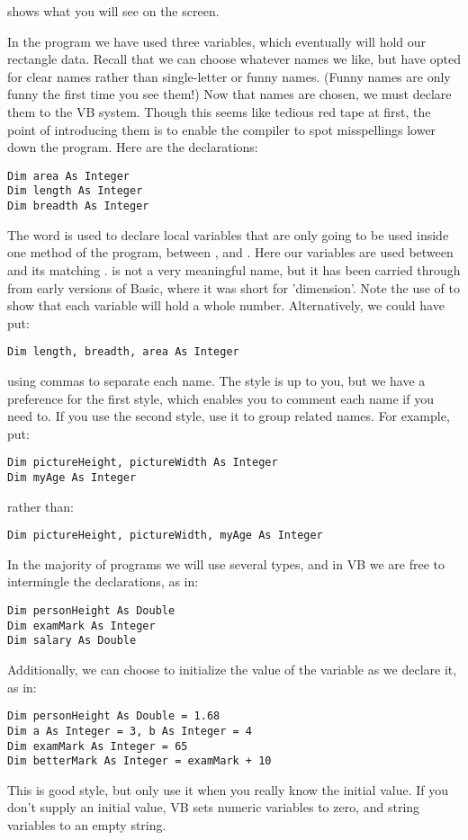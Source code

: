 		 shows what you will see on the screen.

		In the program we have used three  variables, which eventually will hold our rectangle data. Recall that we can choose whatever names we like, but have opted for clear names rather than single-letter or funny names. (Funny names are only funny the first time you see them!)
		Now that names are chosen, we must declare them to the VB system. Though this seems like tedious red tape at first, the point of introducing them is to enable the compiler to spot misspellings lower down the program. Here are the declarations:
		\begin{lstlisting}
Dim area As Integer
Dim length As Integer
Dim breadth As Integer
		\end{lstlisting}
		The word  is used to declare local variables that are only going to be used inside one method of the program, between , and . Here our variables are used between  and its matching .  is not a very meaningful name, but it has been carried through from early versions of Basic, where it was short for 'dimension'.
Note the use of  to show that each variable will hold a whole number. Alternatively, we could have put:
		\begin{lstlisting}
Dim length, breadth, area As Integer
		\end{lstlisting}
		using commas to separate each name. The style is up to you, but we have a preference for the first style, which enables you to comment each name if you need to. If you use the second style, use it to group related names. For example, put:
		\begin{lstlisting}
Dim pictureHeight, pictureWidth As Integer
Dim myAge As Integer
		\end{lstlisting}
		rather than:
		\begin{lstlisting}
Dim pictureHeight, pictureWidth, myAge As Integer
		\end{lstlisting}
		In the majority of programs we will use several types, and in VB we are free to intermingle the declarations, as in:
		\begin{lstlisting}
Dim personHeight As Double
Dim examMark As Integer
Dim salary As Double
		\end{lstlisting}
Additionally, we can choose to initialize the value of the variable as we declare it, as in:
		\begin{lstlisting}
Dim personHeight As Double = 1.68
Dim a As Integer = 3, b As Integer = 4
Dim examMark As Integer = 65
Dim betterMark As Integer = examMark + 10
		\end{lstlisting}
		This is good style, but only use it when you really know the initial value. If you don't supply an initial value, VB sets numeric variables to zero, and string variables to an empty string.

